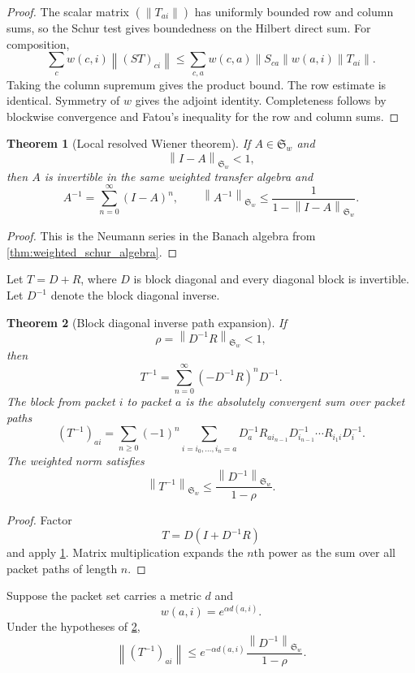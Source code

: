 \documentclass{aomart}
\newtheorem{theorem}{Theorem}[section]
\theoremstyle{definition}
\theoremstyle{remark}
\newcommand{\norm}[1]{\left\lVert#1\right\rVert}
\begin{document}
\begin{proof}
The scalar matrix \((\norm{T_{ai}})\) has uniformly bounded row and column sums, so the Schur test gives boundedness on the Hilbert direct sum. For composition,
\[
 \sum_cw(c,i)\norm{(ST)_{ci}}
 \leq
 \sum_{c,a}w(c,a)\norm{S_{ca}}w(a,i)\norm{T_{ai}}.
\]
Taking the column supremum gives the product bound. The row estimate is identical. Symmetry of \(w\) gives the adjoint identity. Completeness follows by blockwise convergence and Fatou's inequality for the row and column sums.
\end{proof}

\begin{theorem}[Local resolved Wiener theorem]\label{thm:resolved_neumann_inverse}
If \(A\in\mathfrak S_w\) and
\[
 \norm{I-A}_{\mathfrak S_w}<1,
\]
then \(A\) is invertible in the same weighted transfer algebra and
\[
 \boxed{
 A^{-1}
 =
 \sum_{n=0}^{\infty}(I-A)^n,
 \qquad
 \norm{A^{-1}}_{\mathfrak S_w}
 \leq
 \frac1{1-\norm{I-A}_{\mathfrak S_w}}.
 }
\]
\end{theorem}

\begin{proof}
This is the Neumann series in the Banach algebra from \cref{thm:weighted_schur_algebra}.
\end{proof}

Let \(T=D+R\), where \(D\) is block diagonal and every diagonal block is invertible. Let \(D^{-1}\) denote the block diagonal inverse.

\begin{theorem}[Block diagonal inverse path expansion]\label{thm:block_inverse_paths}
If
\[
 \rho=\norm{D^{-1}R}_{\mathfrak S_w}<1,
\]
then
\[
 \boxed{
 T^{-1}
 =
 \sum_{n=0}^{\infty}
 (-D^{-1}R)^nD^{-1}.
 }
\]
The block from packet \(i\) to packet \(a\) is the absolutely convergent sum over packet paths
\[
 \boxed{
 (T^{-1})_{ai}
 =
 \sum_{n\geq0}(-1)^n
 \sum_{i=i_0,\ldots,i_n=a}
 D_a^{-1}R_{a i_{n-1}}D_{i_{n-1}}^{-1}
 \cdots
 R_{i_1i}D_i^{-1}.
 }
\]
The weighted norm satisfies
\[
 \norm{T^{-1}}_{\mathfrak S_w}
 \leq
 \frac{\norm{D^{-1}}_{\mathfrak S_w}}{1-\rho}.
\]
\end{theorem}

\begin{proof}
Factor
\[
 T=D(I+D^{-1}R)
\]
and apply \cref{thm:resolved_neumann_inverse}. Matrix multiplication expands the \(n\)th power as the sum over all packet paths of length \(n\).
\end{proof}

\begin{corollary}\label{cor:inverse_decay}
Suppose the packet set carries a metric \(d\) and
\[
 w(a,i)=e^{\alpha d(a,i)}.
\]
Under the hypotheses of \cref{thm:block_inverse_paths},
\[
 \boxed{
 \norm{(T^{-1})_{ai}}
 \leq
 e^{-\alpha d(a,i)}
 \frac{\norm{D^{-1}}_{\mathfrak S_w}}{1-\rho}.
 }
\]
\end{corollary}
\end{document}
